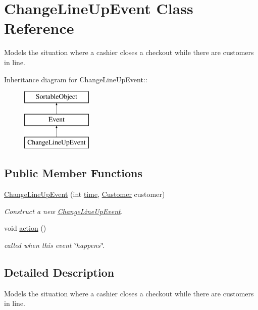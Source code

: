 \hypertarget{class_change_line_up_event}{
\section{ChangeLineUpEvent Class Reference}
\label{class_change_line_up_event}
}
Models the situation where a cashier closes a checkout while there are customers in line.  


Inheritance diagram for ChangeLineUpEvent::\begin{figure}[H]
\begin{center}
\leavevmode
\includegraphics[height=3cm]{class_change_line_up_event}
\end{center}
\end{figure}
\subsection*{Public Member Functions}
\begin{CompactItemize}
\item 
\hyperlink{class_change_line_up_event_4a8c8f7b541c0a113a571348ba54c979}{ChangeLineUpEvent} (int \hyperlink{class_event_d4c0fbb00c3fd993405df98bafcd52c5}{time}, \hyperlink{class_customer}{Customer} customer)
\begin{CompactList}\small\item\em Construct a new \hyperlink{class_change_line_up_event}{ChangeLineUpEvent}. \item\end{CompactList}\item 
void \hyperlink{class_change_line_up_event_e7a0c51e7d5fd3e2e126381045f22683}{action} ()
\begin{CompactList}\small\item\em called when this event \char`\"{}happens\char`\"{}. \item\end{CompactList}\end{CompactItemize}


\subsection{Detailed Description}
Models the situation where a cashier closes a checkout while there are customers in line. 

